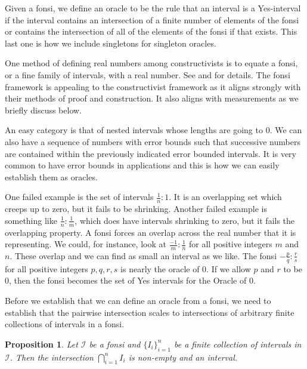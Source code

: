 \documentclass[12pt]{article}
\newtheorem{proposition}{Proposition}[subsection]
\begin{document}
Given a fonsi, we define an oracle to be the rule that an interval is a Yes-interval if the interval contains an intersection of a finite number of elements of the fonsi or contains the intersection of all of the elements of the fonsi if that exists. This last one is how we include singletons for singleton oracles. 

One method of defining real numbers among constructivists is to equate a fonsi, or a fine family of intervals, with a real number. See \cite{bridger} and \cite{bridges} for details. The fonsi framework is appealing to the constructivist framework as it aligns strongly with their methods of proof and construction. It also aligns with measurements as we briefly discuss below. 

An easy category is that of nested intervals whose lengths are going to 0. We can also have a sequence of numbers with error bounds such that successive numbers are contained within the previously indicated error bounded intervals.  It is very common to have error bounds in applications and this is how we can easily establish them as oracles. 

One failed example is the set of intervals $\frac{1}{n}:1$. It is an overlapping set which creeps up to zero, but it fails to be shrinking. Another failed example is something like $\frac{1}{n}:\frac{1}{m}$, which does have intervals shrinking to zero, but it fails the overlapping property. A fonsi forces an overlap across the real number that it is representing. We could, for instance, look at $\frac{-1}{m}:\frac{1}{n}$ for all positive integers $m$ and $n$. These overlap and we can find as small an interval as we like. The fonsi $-\frac{p}{q} : \frac{r}{s}$ for all positive integers $p, q, r, s$ is nearly the oracle of 0. If we allow $p$ and $r$ to be 0, then the fonsi becomes the set of Yes intervals for the Oracle of 0. 

Before we establish that we can define an oracle from a fonsi, we need to establish that the pairwise intersection scales to intersections of arbitrary finite collections of intervals in a fonsi. 

\begin{proposition}
 Let $\mathcal{I}$ be a fonsi and $\{I_i\}_{i=1}^n$ be a finite collection of intervals in $\mathcal{I}$. Then the intersection $\bigcap_{i=1}^n I_i$ is non-empty and an interval.
\end{proposition}
\end{document}
